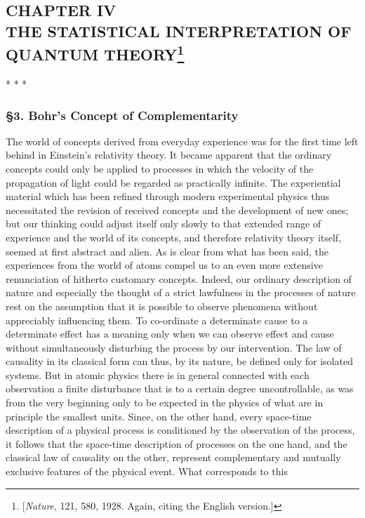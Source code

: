 \subsection*{CHAPTER IV\\ 
THE STATISTICAL INTERPRETATION OF QUANTUM THEORY\footnote{{[}\emph{Nature}, 121,
  580, 1928. Again, citing the English version.{]}}}
\centerline{* * *}

\subsubsection*{§3. Bohr's Concept of Complementarity}


The world of concepts derived from everyday experience was for the first
time left behind in Einstein's relativity theory. It became apparent
that the ordinary concepts could only be applied to processes in which
the velocity of the propagation of light could be regarded as
practically infinite. The experiential material which has been refined
through modern experimental physics thus necessitated the revision of
received concepts and the development of new ones; but our thinking
could adjust itself only slowly to that extended range of experience and
the world of its concepts, and therefore relativity theory itself,
seemed at first abstract and alien. As is clear from what has been said,
the experiences from the world of atoms compel us to an even more
extensive renunciation of hitherto customary concepts. Indeed, our
ordinary description of nature and especially the thought of a strict
lawfulness in the processes of nature rest on the assumption that it is
possible to observe phenomena without appreciably influencing them. To
co-ordinate a determinate cause to a determinate effect has a meaning
only when we can observe effect and cause without simultaneously
disturbing the process by our intervention. The law of causality in its
classical form can thus, by its nature, be defined only for isolated
systems. But in atomic physics there is in general connected with each
observation a finite disturbance that is to a certain degree
uncontrollable, as was from the very beginning only to be expected in
the physics of what are in principle the smallest units. Since, on the
other hand, every space-time description of a physical process is
conditioned by the observation of the process, it follows that the
space-time description of processes on the one hand, and the classical
law of causality on the other, represent complementary and mutually
exclusive features of the physical event. What corresponds to this
